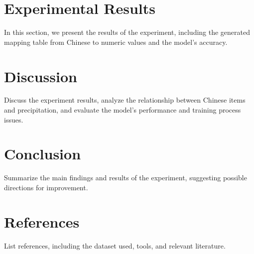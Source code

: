 \documentclass[twocolumn]{article}
\begin{document}
\section{Experimental Results}

In this section, we present the results of the experiment, including the generated mapping table from Chinese to numeric values and the model's accuracy.

\section{Discussion}

Discuss the experiment results, analyze the relationship between Chinese items and precipitation, and evaluate the model's performance and training process issues.

\section{Conclusion}

Summarize the main findings and results of the experiment, suggesting possible directions for improvement.

\section{References}

List references, including the dataset used, tools, and relevant literature.
\end{document}
